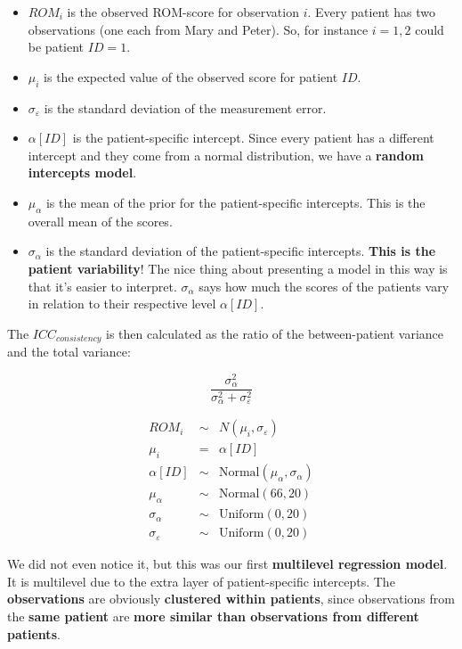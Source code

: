 \documentclass[
]{book}
\providecommand{\tightlist}{%
  \setlength{\itemsep}{0pt}\setlength{\parskip}{0pt}}
\begin{document}
\begin{itemize}
\tightlist
\item
  \(ROM_i\) is the observed ROM-score for observation \(i\).
  Every patient has two observations (one each from Mary and Peter).
  So, for instance \(i=1,2\) could be patient \(ID=1\).
\item
  \(\mu_i\) is the expected value of the observed score for patient \(ID\).
\item
  \(\sigma_{\varepsilon}\) is the standard deviation of the measurement error.
\item
  \(\alpha[ID]\) is the patient-specific intercept.
  Since every patient has a different intercept and they
  come from a normal distribution, we have a \textbf{random intercepts model}.
\item
  \(\mu_{\alpha}\) is the mean of the prior for the patient-specific intercepts.
  This is the overall mean of the scores.
\item
  \(\sigma_{\alpha}\) is the standard deviation of the patient-specific intercepts.
  \textbf{This is the patient variability}! The nice thing about presenting a model in this
  way is that it's easier to interpret. \(\sigma_{\alpha}\) says how much
  the scores of the patients vary in relation to their respective level \(\alpha[ID]\).
\end{itemize}

The \textbf{\(ICC_{consistency}\)} is then calculated as the ratio of the between-patient variance and
the total variance:

\[\frac{\sigma_{\alpha}^2}{\sigma_{\alpha}^2 + \sigma_{\varepsilon}^2}\]

\[
\begin{array}{rcl}
ROM_i &\sim& N(\mu_i, \sigma_{\varepsilon}) \\
\mu_i &=& \alpha[ID] \\
\alpha[ID] &\sim& \text{Normal}(\mu_{\alpha}, \sigma_{\alpha}) \\
\mu_{\alpha} &\sim& \text{Normal}(66, 20) \\
\sigma_{\alpha} &\sim& \text{Uniform}(0,20) \\
\sigma_{\varepsilon} &\sim& \text{Uniform}(0,20)
\end{array}
\]

We did not even notice it, but this was our first \textbf{multilevel regression model}.
It is multilevel due to the extra layer of patient-specific intercepts.
The \textbf{observations} are obviously \textbf{clustered within patients}, since observations
from the \textbf{same patient} are \textbf{more similar than observations from different patients}.
\end{document}
